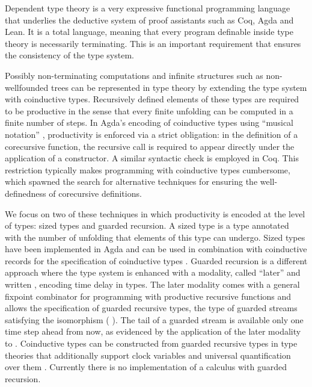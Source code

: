 Dependent type theory is a very expressive functional programming
language that underlies the deductive system of proof assistants such
as Coq, Agda and Lean.  It is a total language,
meaning that every program definable inside type theory is necessarily
terminating. This is an important requirement that ensures the
consistency of the type system. 

Possibly non-terminating computations
and infinite structures such as non-wellfounded trees can be
represented in type theory by extending the type system with
coinductive types. Recursively defined elements of these types
are required to be productive \cite{Coquand93} in the sense that every
finite unfolding can be computed in a finite number of steps.
In Agda's encoding of coinductive types using ``musical notation''
\cite{DA10}, productivity is enforced via a strict obligation: in the
definition of a corecursive function, the recursive
call is required to appear directly under
the application of a constructor. A similar syntactic
check is employed in Coq.
This restriction
typically makes programming with coinductive types cumbersome,
which spawned the search for alternative techniques for ensuring the
well-definedness of corecursive definitions.

We focus on two of these techniques in which productivity is encoded
at the level of types: sized types and guarded recursion. A sized type
\cite{Hughes96} is a type annotated with the number of unfolding that
elements of this type can undergo. Sized types have been implemented
in Agda \cite{A-sized,AVW-normalization} and can be used in
combination with coinductive records for the specification of
coinductive types \cite{Copatterns}.  Guarded recursion \cite{Nakano}
is a different approach where the type system is enhanced with a
modality, called ``later'' and written , encoding time delay in
types. The later modality comes with a general fixpoint combinator for
programming with productive recursive functions and allows the
specification of guarded recursive types, \eg the type of guarded
streams satisfying the isomorphism     
 ( ). The tail of a guarded stream is available only
one time step ahead from now, as evidenced by the application of the
later modality to  . Coinductive types can be constructed
from guarded recursive types in type theories that additionally
support clock variables and universal quantification over them
\cite{atkey2013productive,BahrGM17}. Currently there is no
implementation of a calculus with guarded recursion.

